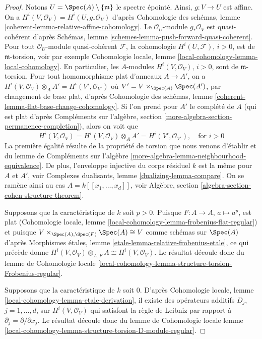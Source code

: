 \begin{proof}
Notons $U = \Spec(A) \setminus \{\mathfrak m\}$ le spectre épointé.
Ainsi, $g : V \to U$ est affine.
On a $H^i(V, \mathcal{O}_V) = H^i(U, g_*\mathcal{O}_V)$ d'après
Cohomologie des schémas, lemme \ref{coherent-lemma-relative-affine-cohomology}.
Le $\mathcal{O}_U$-module $g_*\mathcal{O}_V$ est quasi-cohérent d'après
Schémas, lemme \ref{schemes-lemma-push-forward-quasi-coherent}.
Pour tout $\mathcal{O}_U$-module quasi-cohérent $\mathcal{F}$,
la cohomologie $H^i(U, \mathcal{F})$, $i > 0$,
est de $\mathfrak m$-torsion, voir par exemple
Cohomologie locale, lemme \ref{local-cohomology-lemma-local-cohomology}.
En particulier, les $A$-modules $H^i(V, \mathcal{O}_V)$, $i > 0$,
sont de $\mathfrak m$-torsion.
Pour tout homomorphisme plat d'anneaux $A \to A'$, on a
$H^i(V, \mathcal{O}_V) \otimes_A A' = H^i(V', \mathcal{O}_{V'})$
où $V' = V \times_{\Spec(A)} \Spec(A')$, par changement de base plat, d'après
Cohomologie des schémas, lemme \ref{coherent-lemma-flat-base-change-cohomology}.
Si l'on prend pour $A'$ le complété de $A$ (qui est plat d'après
Compléments sur l'algèbre, section \ref{more-algebra-section-permanence-completion}),
alors on voit que
$$
H^i(V, \mathcal{O}_V) = H^i(V, \mathcal{O}_V) \otimes_A A' =
H^i(V', \mathcal{O}_{V'}),\quad\text{for } i > 0
$$
La première égalité résulte de la propriété de torsion que nous venons d'établir et du
lemme de Compléments sur l'algèbre \ref{more-algebra-lemma-neighbourhood-equivalence}.
De plus, l'enveloppe injective du corps résiduel $k$
est la même pour $A$ et $A'$, voir
Complexes dualisants, lemme \ref{dualizing-lemma-compare}.
On se ramène ainsi au cas $A = k[[x_1, \ldots, x_d]]$, voir
Algèbre, section \ref{algebra-section-cohen-structure-theorem}.

\medskip\noindent
Supposons que la caractéristique de $k$ soit $p > 0$. Puisque $F : A \to A$,
$a \mapsto a^p$, est plat (Cohomologie locale, lemme
\ref{local-cohomology-lemma-frobenius-flat-regular})
et puisque $V \times_{\Spec(A), \Spec(F)} \Spec(A) \cong V$ comme schémas
sur $\Spec(A)$ d'après
Morphismes \'etales, lemme \ref{etale-lemma-relative-frobenius-etale},
ce qui précède donne
$H^i(V, \mathcal{O}_V) \otimes_{A, F} A \cong H^i(V, \mathcal{O}_V)$.
Le résultat découle donc du
lemme de Cohomologie locale
\ref{local-cohomology-lemma-structure-torsion-Frobenius-regular}.

\medskip\noindent
Supposons que la caractéristique de $k$ soit $0$. D'après
Cohomologie locale, lemme \ref{local-cohomology-lemma-etale-derivation},
il existe des opérateurs additifs $D_j$, $j = 1, \ldots, d$, sur
$H^i(V, \mathcal{O}_V)$ qui satisfont la règle de Leibniz par
rapport à $\partial_j = \partial/\partial x_j$.
Le résultat découle donc du
lemme de Cohomologie locale
lemme \ref{local-cohomology-lemma-structure-torsion-D-module-regular}.
\end{proof}

